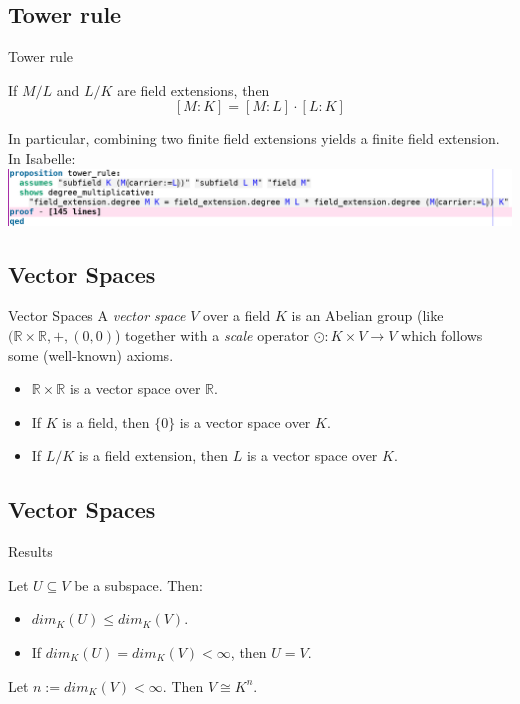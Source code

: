 \documentclass[%
	sans,
	12pt,
]{beamer}
\newcommand{\RR}{\mathbb{R}}
\begin{document}
\subsection{Tower rule}
\begin{frame}{Tower rule}
\begin{theorem}
If $M/L$ and $L/K$ are field extensions, then
\[[M : K] = [M : L] \cdot [L : K]\]\pause
\end{theorem}
In particular, combining two finite field extensions yields a finite field extension.\\[4mm] %
In Isabelle:\\[2mm]
\includegraphics[width=1.1\linewidth]{tower_rule}
\end{frame}

\subsection{Vector Spaces}
\begin{frame}{Vector Spaces}\pause
A \emph{vector space} $V$ over a field $K$ is an Abelian group (like $(\RR\times\RR,+,(0,0)$) together with a \emph{scale} operator $\odot:K\times V \to V$ which follows some (well-known) axioms.\pause
\begin{itemize}
\item $\RR \times \RR$ is a vector space over $\RR$.\pause
\item If $K$ is a field, then $\{0\}$ is a vector space over $K$.\pause
\item If $L/K$ is a field extension, then $L$ is a vector space over $K$.
\end{itemize}
\end{frame}

\subsection{Vector Spaces}
\begin{frame}{Results}\pause
\begin{theorem}
	\upshape
	Let $U \subseteq V$ be a subspace. Then:
	\begin{itemize}
		\item $dim_K(U) \le dim_K(V)$.
		\item If $dim_K(U)=dim_K(V) < \infty$, then $U = V$.
	\end{itemize} %
\end{theorem}\pause
\begin{theorem}
	\upshape
	Let $n := dim_K(V) < \infty$. Then $V \cong K^n$.
\end{theorem}
\end{frame}
\end{document}
